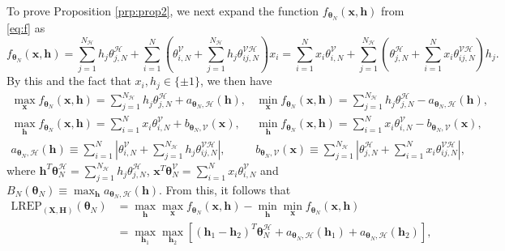 \documentclass[numbib]{imamat}
\theoremstyle{theorem}
\theoremstyle{lemma}
\theoremstyle{example}
\theoremstyle{corollary}
\theoremstyle{definition}
\theoremstyle{remark}
\theoremstyle{approximation}
\theoremstyle{scheme}
\newcommand{\REP}{\mathrm{LREP}}
\newcommand{\Gam}{B_{N}(\boldsymbol \theta_N) }
\begin{document}
To prove Proposition \ref{prp:prop2}, we next expand the function \(f_{\boldsymbol \theta_N} (\boldsymbol x, \boldsymbol h)\) from \eqref{eq:f} as
\[
f_{\boldsymbol \theta_N} (\boldsymbol x, \boldsymbol h)= \sum_{j=1}^{N_\mathcal{H}} h_j \theta_{j,N}^{\mathcal{H}}  +   \sum_{i=1}^N \left( \theta_{i,N}^{\mathcal{V}} + \sum_{j=1}^{N_\mathcal{H}}  h_j  \theta_{ij,N}^{\mathcal{VH}}\right)x_i=\sum_{i=1}^N x_i  \theta_{i,N}^{\mathcal{V}} +  \sum_{j=1}^{N_\mathcal{H}} \left( \theta_{j,N}^{\mathcal{H}}  + \sum_{i=1}^N  x_i  \theta_{ij,N}^{\mathcal{VH}}\right)h_j.
\]
By this and the fact that \(x_i,h_j\in\{\pm 1\}\), we then have
\begin{align}
\nonumber \max_{\boldsymbol x}  f_{\boldsymbol \theta_N} (\boldsymbol x, \boldsymbol h) =  \sum_{j=1}^{N_\mathcal{H}} h_j \theta_{j,N}^{\mathcal{H}}  +   a_{\boldsymbol \theta_N, \mathcal{H}} (\boldsymbol h), & \min_{\boldsymbol x}  f_{\boldsymbol \theta_N} (\boldsymbol x, \boldsymbol h) =  \sum_{j=1}^{N_\mathcal{H}} h_j \theta_{j,N}^{\mathcal{H}}  - a_{\boldsymbol \theta_N, \mathcal{H}} (\boldsymbol h),\\
\nonumber \max_{\boldsymbol h}  f_{\boldsymbol \theta_N} (\boldsymbol x, \boldsymbol h) = \sum_{i=1}^{N}x_i \theta_{i,N}^{\mathcal{V}} + b_{\boldsymbol \theta_N, \mathcal{V}} (\boldsymbol x), & \min_{\boldsymbol h}  f_{\boldsymbol \theta_N} (\boldsymbol x, \boldsymbol h) = \sum_{i=1}^{N}x_i \theta_{i,N}^{\mathcal{V}}  -   b_{\boldsymbol \theta_N, \mathcal{V}} (\boldsymbol x), \\ 
\label{eq:max}
a_{\boldsymbol \theta_N, \mathcal{H}} (\boldsymbol h) \equiv \sum_{i=1}^N \left| \theta_{i,N}^{\mathcal{V}} + \sum_{j=1}^{N_\mathcal{H}}  h_j  \theta_{ij,N}^{\mathcal{VH}}\right|, &  b_{\boldsymbol \theta_N, \mathcal{V}} (\boldsymbol x) \equiv \sum_{j=1}^{N_\mathcal{H}} \left| \theta_{j,N}^{\mathcal{H}}  + \sum_{i=1}^N  x_i  \theta_{ij,N}^{\mathcal{VH}}\right|,
\end{align}
where \(\boldsymbol h^T \boldsymbol \theta_N^{\mathcal{H}}=\sum_{j=1}^{N_\mathcal{H}} h_j \theta_{j,N}^{\mathcal{H}}\), \(\boldsymbol x^T \boldsymbol \theta_N^{\mathcal{V}}= \sum_{i=1}^{N}x_i \theta_{i,N}^{\mathcal{V}}\) and \(\Gam\equiv \max_{\boldsymbol h} a_{\boldsymbol \theta_N, \mathcal{H}} (\boldsymbol h)\).
From this, it follows that
\begin{align*}
\REP_{(\boldsymbol X, \boldsymbol H)}(\boldsymbol \theta_N) &=  \max_{\boldsymbol h}\max_{\boldsymbol x}f_{\boldsymbol \theta_N} (\boldsymbol x , \boldsymbol h) -  \min_{\boldsymbol h}\min_{\boldsymbol x}f_{\boldsymbol \theta_N} (\boldsymbol x , \boldsymbol h)\\
&= \max_{\boldsymbol h_1 }  \max_{\boldsymbol h_2 }\left[ (\boldsymbol h_1 - \boldsymbol h_2)^T \boldsymbol \theta_N^{\mathcal{H}}  +   a_{\boldsymbol \theta_N, \mathcal{H}} (\boldsymbol h_1)  + a_{\boldsymbol \theta_N, \mathcal{H}} (\boldsymbol h_2)\right],
\end{align*}
\end{document}
